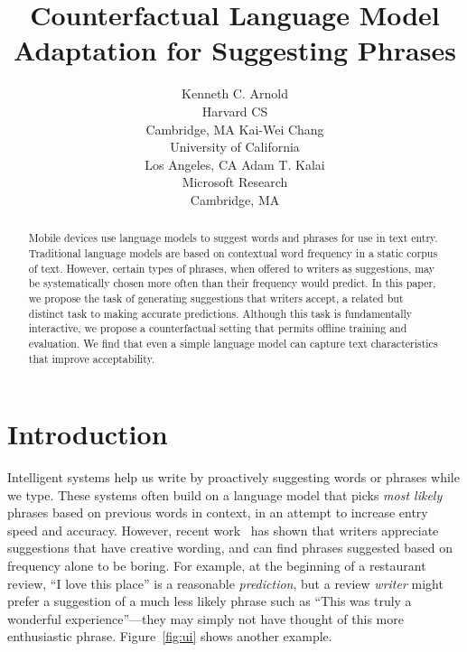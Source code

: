 \documentclass[11pt,letterpaper]{article}
\title{Counterfactual Language Model Adaptation for Suggesting Phrases}
\author{Kenneth C. Arnold \\ Harvard CS\\Cambridge, MA
   \And Kai-Wei Chang \\ University of California\\Los Angeles, CA
   \And Adam T. Kalai \\ Microsoft Research\\Cambridge, MA}
\begin{document}
\maketitle

\begin{abstract}
Mobile devices use language models to suggest words and phrases for use in text entry. Traditional language models are based on contextual word frequency in a static corpus of text. However, certain types of phrases, when offered to writers as suggestions, may be systematically chosen more often than their frequency would predict. In this paper, we propose the task of generating suggestions that writers accept, a related but distinct task to making accurate predictions. Although this task is fundamentally interactive, we propose a counterfactual setting that permits offline training and evaluation. We find that even a simple language model can capture text characteristics that improve acceptability.
%

\end{abstract}

%
%
%
%

\section{Introduction}
\label{sec:intro}

%
%
%

Intelligent systems help us write by proactively suggesting words or phrases while we type.
These systems often build on a language model that picks \emph{most likely}
phrases based on previous words in context, in an attempt to increase entry speed and accuracy. However, recent work~\cite{megasuggestUI} has shown that writers appreciate suggestions that have creative wording, and can find phrases suggested based on frequency alone to be boring.
For example, at the beginning of a restaurant review, ``I love this place'' is a reasonable \emph{prediction}, but a review \emph{writer} might prefer a suggestion of a much less likely phrase such as ``This was truly a wonderful experience''---they may simply not have thought of this more enthusiastic phrase.
Figure~\ref{fig:ui} shows another example.
\end{document}
